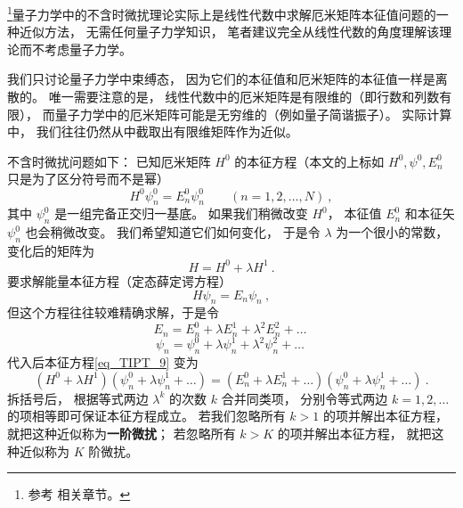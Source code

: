 

\footnote{参考 \cite{GriffQ} \cite{Shankar} \cite{Sakurai} \cite{Merzbacher} 相关章节。}量子力学中的不含时微扰理论实际上是线性代数中求解厄米矩阵本征值问题的一种近似方法， 无需任何量子力学知识， 笔者建议完全从线性代数的角度理解该理论而不考虑量子力学。

我们只讨论量子力学中束缚态， 因为它们的本征值和厄米矩阵的本征值一样是离散的。 唯一需要注意的是， 线性代数中的厄米矩阵是有限维的（即行数和列数有限）， 而量子力学中的厄米矩阵可能是无穷维的（例如量子简谐振子）。 实际计算中， 我们往往仍然从中截取出有限维矩阵作为近似。

不含时微扰问题如下： 已知厄米矩阵 $H^0$ 的本征方程（本文的上标如 $H^0, \psi^0, E_n^0$ 只是为了区分符号而不是幂）
\begin{equation}
H^0 \psi_n^0 = E_n^0 \psi_n^0 \qquad (n = 1,2,\dots, N)~,
\end{equation}
其中 $\psi_n^0$ 是一组完备正交归一基底。 如果我们稍微改变 $H^0$， 本征值 $E_n^0$ 和本征矢 $\psi_n^0$ 也会稍微改变。 我们希望知道它们如何变化， 于是令 $\lambda$ 为一个很小的常数， 变化后的矩阵为
\begin{equation}\label{eq_TIPT_3}
H = H^0 + \lambda H^1~.
\end{equation}
要求解能量本征方程（定态薛定谔方程）
\begin{equation}\label{eq_TIPT_9}
H \psi_n = E_n \psi_n~,
\end{equation}
但这个方程往往较难精确求解，于是令
\begin{equation}\label{eq_TIPT_11}
E_n = E_n^0 + \lambda E_n^1 + \lambda^2 E_n^2 + \dots~
\end{equation}
\begin{equation}\label{eq_TIPT_12}
\psi_n = \psi_n^0 + \lambda\psi_n^1 + \lambda^2 \psi_n^2 + \dots~
\end{equation}
代入后本征方程\autoref{eq_TIPT_9} 变为
\begin{equation}\label{eq_TIPT_10}
(H^0 + \lambda H^1)(\psi_n^0 + \lambda\psi_n^1 + \dots) = (E_n^0 + \lambda E_n^1 + \dots)(\psi_n^0 + \lambda\psi_n^1 + \dots)~.
\end{equation}
拆括号后， 根据等式两边 $\lambda^k$ 的次数 $k$ 合并同类项， 分别令等式两边 $k=1,2,\dots$ 的项相等即可保证本征方程成立。 若我们忽略所有 $k > 1$ 的项并解出本征方程， 就把这种近似称为\textbf{一阶微扰}； 若忽略所有 $k > K$ 的项并解出本征方程， 就把这种近似称为 $K$ 阶微扰。


